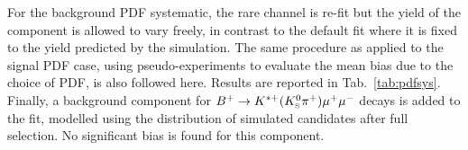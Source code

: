 \begin{center}
\begin{table}[h]
\centering
\caption{$\chisq$, , p-values and number of signal events obtained fitting \mbox{$\Lb\to\jpsi\Lz$} data using different models.}
\label{PDFsys}
\end{table}
\end{center}

For the background PDF systematic, the rare channel is re-fit but the yield of the \KS component is allowed to vary freely, 
in contrast to the default fit where it is fixed to the yield predicted by the simulation. The same procedure as applied to the signal PDF case, 
using pseudo-experiments to evaluate the mean bias due to the choice of PDF, is also followed here. Results are reported in Tab.~\ref{tab:pdfsys}. 
Finally, a background component for $B^{+} \ra K^{*+}(\KS\pi^+)\mumu$ decays is added to the fit, modelled using
the distribution of simulated candidates after full selection. No significant bias is found for this component.

